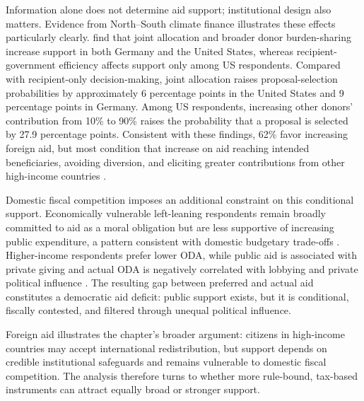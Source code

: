 Information alone does not determine aid support; institutional design also matters. Evidence from North--South climate finance illustrates these effects particularly clearly. \citet{gampfer_obtaining_2014} find that joint allocation and broader donor burden-sharing increase support in both Germany and the United States, whereas recipient-government efficiency affects support only among US respondents. %
Compared with recipient-only decision-making, joint allocation raises proposal-selection probabilities by approximately 6 percentage points in the United States and 9 percentage points in Germany. Among US respondents, increasing other donors' contribution from 10\% to 90\% raises the probability that a proposal is selected by 27.9 percentage points. 
Consistent with these findings, 62\% %
favor increasing foreign aid, but most condition that increase on aid reaching intended beneficiaries, avoiding diversion, and eliciting greater contributions from other high-income countries \citep{fabre_majority_2025}. %

Domestic fiscal competition imposes an additional constraint on this conditional support. Economically vulnerable left-leaning respondents remain broadly committed to aid as a moral obligation but are less supportive of increasing public expenditure, a pattern consistent with domestic budgetary trade-offs \citep{cho_ideology_2024}. %
Higher-income respondents prefer lower ODA, while public aid is associated with private giving and actual ODA is negatively correlated with lobbying and private political influence \citep{kaufmann_foreign_2019}. The resulting gap between preferred and actual aid constitutes a democratic aid deficit: public support exists, but it is conditional, fiscally contested, and filtered through unequal political influence.

Foreign aid illustrates the chapter's broader argument: citizens in high-income countries may accept international redistribution, but support depends on credible institutional safeguards and remains vulnerable to domestic fiscal competition. The analysis therefore turns to whether more rule-bound, tax-based instruments can attract equally broad or stronger support.



